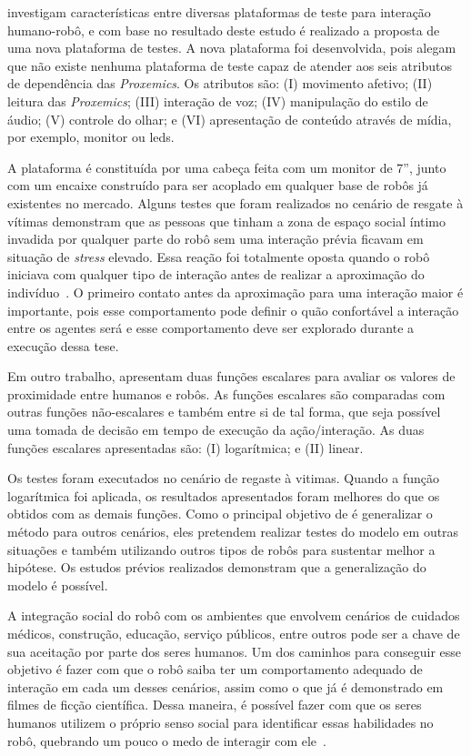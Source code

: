  investigam características entre diversas plataformas de teste para interação humano-robô, e com base no resultado deste estudo é realizado a proposta de uma nova plataforma de testes. A nova plataforma foi desenvolvida, pois  alegam que não existe nenhuma plataforma de teste capaz de atender aos seis atributos de dependência das \emph{Proxemics}. Os atributos são: (I) movimento afetivo; (II) leitura das \emph{Proxemics}; (III) interação de voz; (IV) manipulação do estilo de áudio; (V) controle do olhar; e (VI) apresentação de conteúdo através de mídia, por exemplo, monitor ou leds.

A plataforma é constituída por uma cabeça feita com um monitor de 7'', junto com um encaixe construído para ser acoplado em qualquer base de robôs já existentes no mercado. Alguns testes que foram realizados no cenário de resgate à vítimas demonstram que as pessoas que tinham a zona de espaço social íntimo invadida por qualquer parte do robô sem uma interação prévia ficavam em situação de \emph{stress} elevado. Essa reação foi totalmente oposta quando o robô iniciava com qualquer tipo de interação antes de realizar a aproximação do indivíduo~\cite{Henkel:2012}. O primeiro contato antes da aproximação para uma interação maior é importante, pois esse comportamento pode definir o quão confortável a interação entre os agentes será e esse comportamento deve ser explorado durante a execução dessa tese. 

Em outro trabalho,  apresentam duas funções escalares para avaliar os valores de proximidade entre humanos e robôs. As funções escalares são comparadas com outras funções não-escalares e também entre si de tal forma, que seja possível uma tomada de decisão em tempo de execução da ação/interação. As duas funções escalares apresentadas são: (I) logarítmica; e (II) linear.

Os testes foram executados no cenário de regaste à vitimas. Quando a função logarítmica foi aplicada, os resultados apresentados foram melhores do que os obtidos com as demais funções. Como o principal objetivo de  é generalizar o método para outros cenários, eles pretendem realizar testes do modelo em outras situações e também utilizando outros tipos de robôs para sustentar melhor a hipótese. Os estudos prévios realizados demonstram que a generalização do modelo é possível.

A integração social do robô com os ambientes que envolvem cenários de cuidados médicos, construção, educação, serviço públicos, entre outros pode ser a chave de sua aceitação por parte dos seres humanos. Um dos caminhos para conseguir esse objetivo é fazer com que o robô saiba ter um comportamento adequado de interação em cada um desses cenários, assim como o que já é demonstrado em filmes de ficção científica. Dessa maneira, é possível fazer com que os seres humanos utilizem o próprio senso social para identificar essas habilidades no robô, quebrando um pouco o medo de interagir com ele~\cite{Heenan:2014}.

